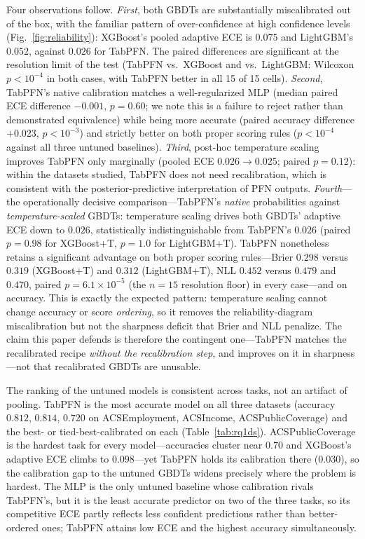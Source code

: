 \documentclass[review,12pt]{elsarticle}
\begin{document}
Four observations follow. \emph{First}, both GBDTs are substantially miscalibrated out of the box, with the familiar pattern of over-confidence at high confidence levels (Fig.~\ref{fig:reliability}): XGBoost's pooled adaptive ECE is $0.075$ and LightGBM's $0.052$, against $0.026$ for TabPFN. The paired differences are significant at the resolution limit of the test (TabPFN vs.\ XGBoost and vs.\ LightGBM: Wilcoxon $p<10^{-4}$ in both cases, with TabPFN better in all 15 of 15 cells). \emph{Second}, TabPFN's native calibration matches a well-regularized MLP (median paired ECE difference $-0.001$, $p=0.60$; we note this is a failure to reject rather than demonstrated equivalence) while being more accurate (paired accuracy difference $+0.023$, $p<10^{-3}$) and strictly better on both proper scoring rules ($p<10^{-4}$ against all three untuned baselines). \emph{Third}, post-hoc temperature scaling improves TabPFN only marginally (pooled ECE $0.026 \to 0.025$; paired $p=0.12$): within the datasets studied, TabPFN does not need recalibration, which is consistent with the posterior-predictive interpretation of PFN outputs. \emph{Fourth}---the operationally decisive comparison---TabPFN's \emph{native} probabilities against \emph{temperature-scaled} GBDTs: temperature scaling drives both GBDTs' adaptive ECE down to $0.026$, statistically indistinguishable from TabPFN's $0.026$ (paired $p=0.98$ for XGBoost+T, $p=1.0$ for LightGBM+T). TabPFN nonetheless retains a significant advantage on both proper scoring rules---Brier $0.298$ versus $0.319$ (XGBoost+T) and $0.312$ (LightGBM+T), NLL $0.452$ versus $0.479$ and $0.470$, paired $p=6.1\times10^{-5}$ (the $n=15$ resolution floor) in every case---and on accuracy. This is exactly the expected pattern: temperature scaling cannot change accuracy or score \emph{ordering}, so it removes the reliability-diagram miscalibration but not the sharpness deficit that Brier and NLL penalize. The claim this paper defends is therefore the contingent one---TabPFN matches the recalibrated recipe \emph{without the recalibration step}, and improves on it in sharpness---not that recalibrated GBDTs are unusable.

The ranking of the untuned models is consistent across tasks, not an artifact of pooling. TabPFN is the most accurate model on all three datasets (accuracy $0.812$, $0.814$, $0.720$ on ACSEmployment, ACSIncome, ACSPublicCoverage) and the best- or tied-best-calibrated on each (Table~\ref{tab:rq1ds}). ACSPublicCoverage is the hardest task for every model---accuracies cluster near $0.70$ and XGBoost's adaptive ECE climbs to $0.098$---yet TabPFN holds its calibration there ($0.030$), so the calibration gap to the untuned GBDTs widens precisely where the problem is hardest. The MLP is the only untuned baseline whose calibration rivals TabPFN's, but it is the least accurate predictor on two of the three tasks, so its competitive ECE partly reflects less confident predictions rather than better-ordered ones; TabPFN attains low ECE and the highest accuracy simultaneously.
\end{document}
